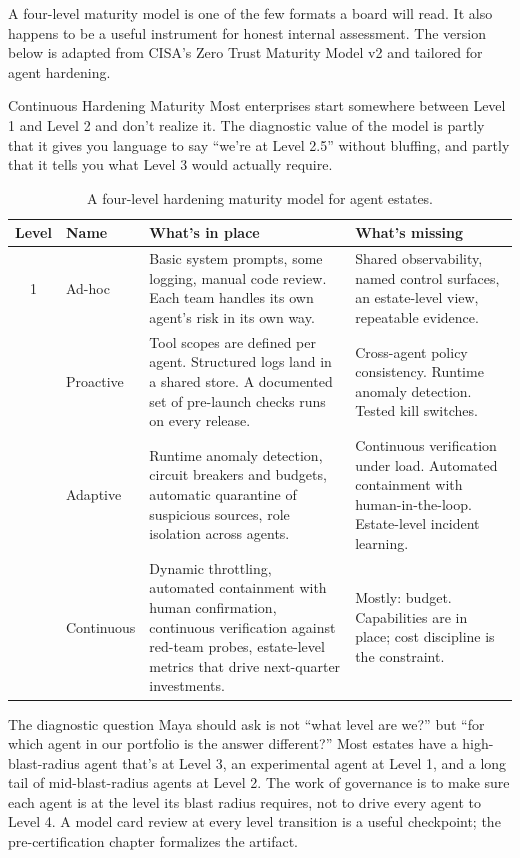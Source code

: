 A four-level maturity model is one of the few formats a board will read. It also happens to be a useful instrument for honest internal assessment. The version below is adapted from CISA's Zero Trust Maturity Model v2 \citep{cisa-ztmm-v2} and tailored for agent hardening.

\begin{TNinpractice}{Continuous Hardening Maturity}
Most enterprises start somewhere between Level 1 and Level 2 and don't realize it. The diagnostic value of the model is partly that it gives you language to say ``we're at Level 2.5'' without bluffing, and partly that it tells you what Level 3 would actually require.
\end{TNinpractice}

\begin{table}[tb]
\centering
\small
\caption{A four-level hardening maturity model for agent estates.}
\begin{tabularx}{\textwidth}{@{}clXX@{}}
\toprule
\textbf{Level} & \textbf{Name} & \textbf{What's in place} & \textbf{What's missing} \\
\midrule
1 & Ad-hoc & Basic system prompts, some logging, manual code review. Each team handles its own agent's risk in its own way. & Shared observability, named control surfaces, an estate-level view, repeatable evidence. \\
\addlinespace
2 & Proactive & Tool scopes are defined per agent. Structured logs land in a shared store. A documented set of pre-launch checks runs on every release. & Cross-agent policy consistency. Runtime anomaly detection. Tested kill switches. \\
\addlinespace
3 & Adaptive & Runtime anomaly detection, circuit breakers and budgets, automatic quarantine of suspicious sources, role isolation across agents. & Continuous verification under load. Automated containment with human-in-the-loop. Estate-level incident learning. \\
\addlinespace
4 & Continuous & Dynamic throttling, automated containment with human confirmation, continuous verification against red-team probes, estate-level metrics that drive next-quarter investments. & Mostly: budget. Capabilities are in place; cost discipline is the constraint. \\
\bottomrule
\end{tabularx}
\end{table}

The diagnostic question Maya should ask is not ``what level are we?'' but ``for which agent in our portfolio is the answer different?'' Most estates have a high-blast-radius agent that's at Level 3, an experimental agent at Level 1, and a long tail of mid-blast-radius agents at Level 2. The work of governance is to make sure each agent is at the level its blast radius requires, not to drive every agent to Level 4. A model card review at every level transition is a useful checkpoint; the pre-certification chapter formalizes the artifact.

